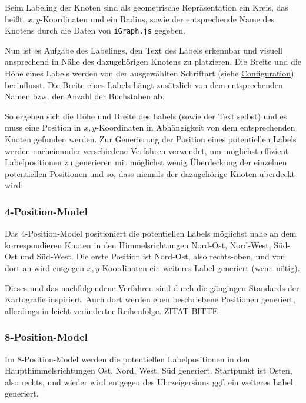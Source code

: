 

Beim Labeling der Knoten sind als geometrische Repräsentation ein Kreis, das heißt, $x,y$-Koordinaten
und ein Radius, sowie der entsprechende Name des Knotens durch die Daten von \texttt{iGraph.js} gegeben.

Nun ist es Aufgabe des Labelings, den Text des Labels erkennbar und visuell ansprechend in Nähe des dazugehörigen Knotens zu platzieren.
Die Breite und die Höhe eines Labels werden von der ausgewählten Schriftart (siehe \hyperref[sec:configuration]{Configuration}) beeinflusst.
Die Breite eines Labels hängt zusätzlich von dem entsprechenden Namen bzw. der Anzahl der Buchstaben ab.

So ergeben sich die Höhe und Breite des Labels (sowie der Text selbst) und es muss eine Position in $x,y$-Koordinaten in Abhängigkeit
von dem entsprechenden Knoten gefunden werden.
Zur Generierung der Position eines potentiellen Labels werden nacheinander verschiedene Verfahren verwendet, um möglichst effizient Labelpositionen zu generieren
mit möglichst wenig Überdeckung der einzelnen potentiellen Positionen und so, dass niemals der dazugehörige Knoten überdeckt wird:

\subsubsection{4-Position-Model}
\label{subsubsec:4pos}
Das 4-Position-Model positioniert die potentiellen Labels möglichst nahe an dem korrespondieren Knoten in den Himmelsrichtungen Nord-Ost, Nord-West, Süd-Ost und Süd-West.
Die erste Position ist Nord-Ost, also rechts-oben, und von dort an wird entgegen $x,y$-Koordinaten ein weiteres Label generiert (wenn nötig).

Dieses und das nachfolgendene Verfahren sind durch die gängingen Standards der Kartografie inspiriert. Auch dort werden eben beschriebene
Positionen generiert, allerdings in leicht veränderter Reihenfolge. ZITAT BITTE

\subsubsection{8-Position-Model}
\label{subsubsec:8pos}
Im 8-Position-Model werden die potentiellen Labelpositionen in den Haupthimmelsrichtungen Ost, Nord, West, Süd generiert.
Startpunkt ist Osten, also rechts, und wieder wird entgegen des Uhrzeigersinns ggf. ein weiteres Label generiert.

